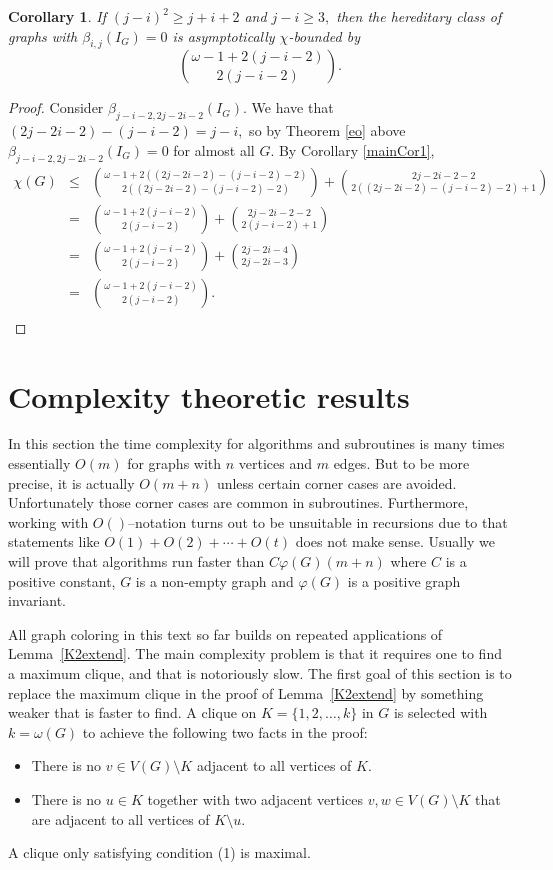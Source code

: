 \documentclass{article}
\theoremstyle{plain}
\newtheorem{cor}[thm]{Corollary}
\theoremstyle{definition}
\begin{document}
\begin{cor} \label{asymBound} If  $(j-i)^2 \geq j+i+2$ and $j-i\geq 3,$ then the hereditary class of graphs with $ \beta_{i,j}(I_G) = 0$ is 
asymptotically $\chi$-bounded by 
\[ {\omega-1+2(j-i-2) \choose 2(j-i-2)}. \]
\end{cor}
\begin{proof}
Consider $\beta_{j-i-2,2j-2i-2}(I_G).$ We have that $(2j-2i-2)-(j-i-2)=j-i,$ so by Theorem \ref{eo} above $\beta_{j-i-2,2j-2i-2}(I_G)=0$ for almost all $G.$
By Corollary  \ref{mainCor1},
\[
\begin{array}{rcl}
\chi(G) & \leq &  \displaystyle {\omega-1+2((2j-2i-2)-(j-i-2)-2) \choose 2((2j-2i-2)-(j-i-2)-2)} +  {2j-2i-2-2 \choose 2((2j-2i-2)-(j-i-2)-2)+1} \\
& =  & \displaystyle  {\omega-1+2(j-i-2) \choose 2(j-i-2)} +  {2j-2i-2-2 \choose 2(j-i-2)+1} \\
& =  & \displaystyle  {\omega-1+2(j-i-2) \choose 2(j-i-2)} +  {2j-2i-4 \choose 2j-2i-3} \\
& =  & \displaystyle  {\omega-1+2(j-i-2) \choose 2(j-i-2)}. \\
\end{array}
\]
\end{proof}
\section{Complexity theoretic results}

In this section the time complexity for algorithms and subroutines is many times essentially $O(m)$ for graphs with $n$ vertices and $m$ edges. But to be more precise, it is actually $O(m+n)$ unless
certain corner cases are avoided. Unfortunately those corner cases are common in subroutines. Furthermore, working with $O()$--notation turns out to be unsuitable in recursions due to that statements like $O(1)+O(2)+\cdots+O(t)$ does not make sense. Usually we will prove that algorithms run faster than $C\varphi(G)(m+n)$ where $C$ is a positive constant, $G$ is a non-empty graph and $\varphi(G)$ is a positive graph invariant.

All graph coloring in this text so far builds on repeated applications of Lemma~\ref{K2extend}. The main complexity problem is that it requires one to find a maximum clique, and that is notoriously slow.
The first goal of this section is to replace the maximum clique in the proof of Lemma~\ref{K2extend} by something weaker that is faster to find. A clique on $K=\{1,2,\ldots, k\}$ in $G$ is selected with 
$k=\omega(G)$ to achieve the following two facts in the proof:
\begin{itemize}
\item[(1)] There is no $v \in V(G)\setminus K$ adjacent to all vertices of $K.$
\item[(2)] There is no $u\in K$ together with two adjacent vertices $v ,w \in V(G)\setminus K$ that are adjacent to all vertices of $K\setminus u.$
\end{itemize}
A clique only satisfying condition (1) is maximal.
\end{document}
